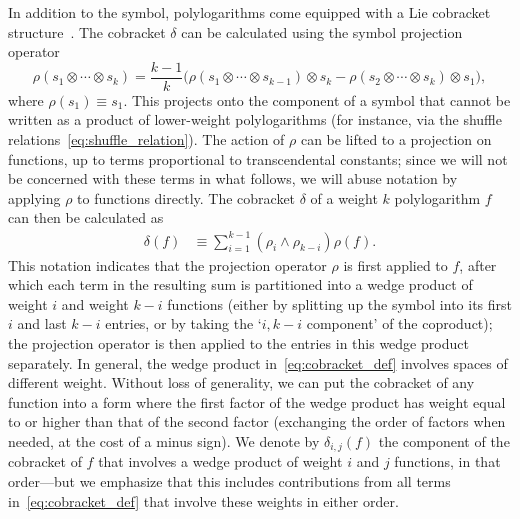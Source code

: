 \documentclass[12pt]{article}
\begin{document}
In addition to the symbol, polylogarithms come equipped with a Lie cobracket structure~\cite{Golden:2013xva}. The cobracket $\delta$ can be calculated using the symbol projection operator 
\begin{equation}
\rho(s_1 \otimes \cdots \otimes s_k ) = \frac{k-1}{k} \Big(\rho(s_1 \otimes \cdots \otimes s_{k-1}) \otimes s_k - \rho(s_2 \otimes \cdots \otimes s_{k}) \otimes s_1 \Big),
\end{equation}
where $\rho(s_1) \equiv s_1$. This projects onto the component of a symbol that cannot be written as a product of lower-weight polylogarithms (for instance, via the shuffle relations~\eqref{eq:shuffle_relation}). The action of $\rho$ can be lifted to a projection on functions, up to terms proportional to transcendental constants; since we will not be concerned with these terms in what follows, we will abuse notation by applying $\rho$ to functions directly. The cobracket $\delta$ of a weight $k$ polylogarithm $f$ can then be calculated as
\begin{align} \label{eq:cobracket_def}
\delta(f) &\equiv \sum_{i=1}^{k-1} (\rho_i \wedge \rho_{k-i})\rho(f) .
\end{align}
This notation indicates that the projection operator $\rho$ is first applied to $f$, after which each term in the resulting sum is partitioned into a wedge product of weight $i$ and weight $k-i$ functions (either by splitting up the symbol into its first $i$ and last $k-i$ entries, or by taking the `$i,k-i$ component' of the coproduct); the projection operator is then applied to the entries in this wedge product separately. In general, the wedge product in~\eqref{eq:cobracket_def} involves spaces of different weight. Without loss of generality, we can put the cobracket of any function into a form where the first factor of the wedge product has weight equal to or higher than that of the second factor (exchanging the order of factors when needed, at the cost of a minus sign). We denote by $\delta_{i,j}(f)$ the component of the cobracket of $f$ that involves a wedge product of weight $i$ and $j$ functions, in that order---but we emphasize that this includes contributions from all terms in~\eqref{eq:cobracket_def} that involve these weights in either order.
\end{document}
